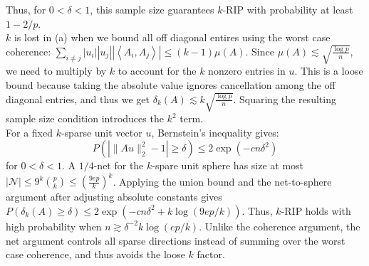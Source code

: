 \documentclass[11pt,a4paper,margin=1in]{article}
\begin{document}
\begin{enumerate}[(a)]
    Thus, for $0 < \delta < 1$, this sample size guarantees $k$-RIP with probability
    at least $1 - 2/p$. \\
    $k$ is lost in (a) when we bound all off diagonal entires using the worst
    case coherence: $\sum_{i \neq j} |u_i||u_j||\left<A_i, A_j\right>| \leq (k - 1)\mu(A)$.
    Since $\mu(A) \lesssim \sqrt{\frac{\log p}{n}}$, we need to multiply by $k$ 
    to account for the $k$ nonzero entries in $u$. This is a loose bound because
    taking the absolute value ignores cancellation among the off diagonal entries, 
    and thus we get $\delta_k(A) \lesssim k\sqrt{\frac{\log p}{n}}$. Squaring the
    resulting sample size condition introduces the $k^2$ term. \\
    For a fixed $k$-sparse unit vector $u$, Bernstein's inequality gives:
    \[
        P(|\|Au\|_2^2 - 1| \geq \delta) \leq 2\exp(-cn\delta^2)
    \]
    for $0 < \delta < 1$. A $1/4$-net for the $k$-spare unit sphere has size
    at most $|\mathcal{N}| \leq 9^k\binom{p}{k} \leq \left(\frac{9ep}{k}\right)^k$. 
    Applying the union bound and the net-to-sphere argument after adjusting 
    absolute constants gives $P(\delta_k(A) \geq \delta) \leq 2\exp\left(-cn\delta^2 + k\log(9ep/k)\right)$.
    Thus, $k$-RIP holds with high probability when $n \gtrsim \delta^{-2}k\log(ep/k)$.
    Unlike the coherence argument, the net argument controls all sparse directions
    instead of summing over the worst case coherence, and thus avoids the loose $k$ factor.
\end{enumerate}
\end{document}
